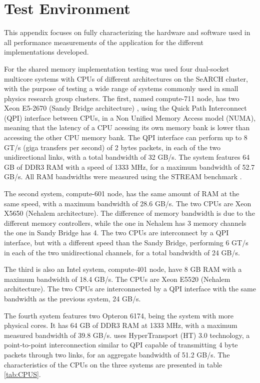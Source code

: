 \appendix
{}
\chapter{Test Environment}
\label{App:TestEnv}

This appendix focuses on fully characterizing the hardware and software used in all performance measurements of the application for the different implementations developed.

For the shared memory implementation testing was used four dual-socket multicore systems with CPUs of different architectures on the SeARCH cluster, with the purpose of testing a wide range of systems commonly used in small physics research group clusters. The first, named compute-711 node, has two \intel Xeon E5-2670 (Sandy Bridge architecture) \cite{Intel:E52650}, using the Quick Path Interconnect (QPI) interface between CPUs, in a Non Unified Memory Access model (NUMA), meaning that the latency of a CPU acessing its own memory bank is lower than accessing the other CPU memory bank. The QPI interface can perform up to 8 GT/s (giga transfers per second) of 2 bytes packets, in each of the two unidirectional links, with a total bandwidth of 32 GB/s. The system features 64 GB of DDR3 RAM with a speed of 1333 MHz, for a maximum bandwidth of 52.7 GB/s. All RAM bandwidths were measured using the STREAM benchmark \cite{STREAM}.

The second system, compute-601 node, has the same amount of RAM at the same speed, with a maximum bandwidth of 28.6 GB/s. The two CPUs are \intel Xeon X5650 (Nehalem architecture). The difference of memory bandwidth is due to the different memory controllers, while the one in Nehalem has 3 memory channels the one in Sandy Bridge has 4. The two CPUs are interconnect by a QPI interface, but with a different speed than the Sandy Bridge, performing 6 GT/s in each of the two unidirectional channels, for a total bandwidth of 24 GB/s.

The third is also an Intel system, compute-401 node, have 8 GB RAM with a maximum bandwidth of 18.4 GB/s. The CPUs are \intel Xeon E5520 (Nehalem architecture). The two CPUs are interconnected by a QPI interface with the same bandwidth as the previous system, 24 GB/s.

The fourth system features two \amd Opteron 6174, being the system with more physical cores. It has 64 GB of DDR3 RAM at 1333 MHz, with a maximum measured bandwidth of 39.8 GB/s. \amd uses HyperTransport (HT) 3.0 technology, a point-to-point interconnection similar to QPI capable of transmitting 4 byte packets through two links, for an aggregate bandwidth of 51.2 GB/s. The characteristics of the CPUs on the three systems are presented in table \ref{tab:CPUS}.

